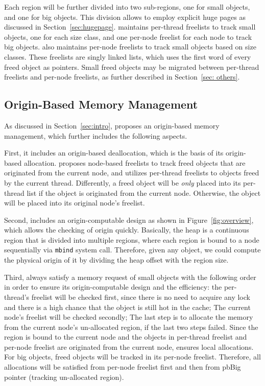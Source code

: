 Each region will be further divided into two sub-regions, one for small objects, and one for big objects. This division allows \NM{} to employ explicit huge pages as discussed in Section~\ref{sec:hugepage}. \NM{} maintains per-thread freelists to track small objects, one for each size class, and one per-node freelist for each node to track big objects. \NM{} also maintains per-node freelists to track small objects based on size classes. These freelists are singly linked lists, which uses the first word of every freed object as pointers.  Small freed objects may be migrated between per-thread freelists and per-node freelists, as further described in Section~\ref{sec: others}. 

\subsection{Origin-Based Memory Management} 
\label{sec:taskassign}

As discussed in Section~\ref{sec:intro}, \NM{} proposes an origin-based memory management, which further includes the following aspects. 

First, it includes an origin-based deallocation, which is the basis of its origin-based allocation. \NM{} proposes node-based freelists to track freed objects that are originated from the current node, and utilizes per-thread freelists to objects freed by the current thread. Differently, a freed object will be \textit{only} placed into its per-thread list if the object is originated from the current node. Otherwise, the object will be placed into its original node's freelist.  

Second, \NM{} includes an origin-computable design as shown in Figure~\ref{fig:overview}, which allows the checking of origin quickly. Basically, the heap is a continuous region that is divided into multiple regions, where each region is bound to a node sequentially via \texttt{mbind} system call. Therefore, given any object, we could compute the physical origin of it by dividing the heap offset with the region size. 

Third, \NM{} always satisfy a memory request of small objects with the following order in order to ensure its origin-computable design and the efficiency: the per-thread's freelist will be checked first, since there is no need to acquire any lock and there is a high chance that the object is still hot in the cache; The current node's freelist will be checked secondly; The last step is to allocate the memory from the current node's un-allocated region, if the last two steps failed. Since the region is bound to the current node and the objects in per-thread freelist and per-node freelist are originated from the current node, \NM{} ensures local allocations. For big objects, freed objects will be tracked in its per-node freelist. Therefore, all allocations will be satisfied from per-node freelist first and then from pbBig pointer (tracking un-allocated region). 


